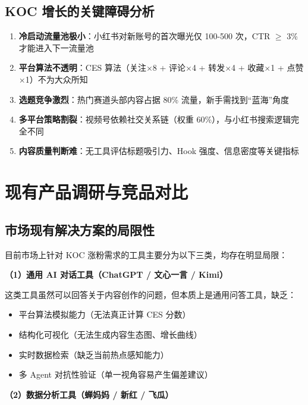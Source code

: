 \documentclass[12pt,a4paper]{ctexart}
\newenvironment{keybox}[1]{%
  \begin{tcolorbox}[colback=primary!8,colframe=primary,
    title={\textbf{#1}},fonttitle=\color{white}\bfseries,
    coltitle=white,left=6pt,right=6pt,top=4pt,bottom=4pt,
    arc=4pt]
}{%
  \end{tcolorbox}
  \vspace{0.3cm}
}
\begin{document}
\subsection{KOC 增长的关键障碍分析}

\begin{keybox}{为什么大学生 KOC 在 0-1000 粉阶段最难突破？}
\begin{enumerate}
  \item \textbf{冷启动流量池极小}：小红书对新账号的首次曝光仅 100-500 次，CTR $\geq$ 3\% 才能进入下一流量池
  \item \textbf{平台算法不透明}：CES 算法（关注$\times$8 + 评论$\times$4 + 转发$\times$4 + 收藏$\times$1 + 点赞$\times$1）不为大众所知
  \item \textbf{选题竞争激烈}：热门赛道头部内容占据 80\% 流量，新手需找到``蓝海''角度
  \item \textbf{多平台策略割裂}：视频号依赖社交关系链（权重 60\%），与小红书搜索逻辑完全不同
  \item \textbf{内容质量判断难}：无工具评估标题吸引力、Hook 强度、信息密度等关键指标
\end{enumerate}
\end{keybox}


\section{现有产品调研与竞品对比}

\subsection{市场现有解决方案的局限性}

目前市场上针对 KOC 涨粉需求的工具主要分为以下三类，均存在明显局限：

\textbf{（1）通用 AI 对话工具（ChatGPT / 文心一言 / Kimi）}

这类工具虽然可以回答关于内容创作的问题，但本质上是通用问答工具，缺乏：
\begin{itemize}
  \item 平台算法模拟能力（无法真正计算 CES 分数）
  \item 结构化可视化（无法生成内容生态图、增长曲线）
  \item 实时数据检索（缺乏当前热点感知能力）
  \item 多 Agent 对抗性验证（单一视角容易产生偏差建议）
\end{itemize}

\textbf{（2）数据分析工具（蝉妈妈 / 新红 / 飞瓜）}
\end{document}
